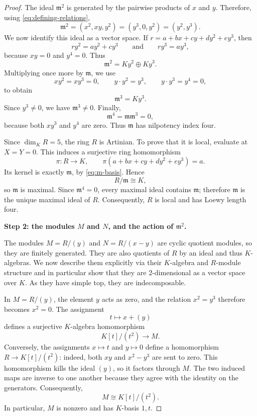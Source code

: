 \documentclass[a4paper]{amsart}
\theoremstyle{definition}
\theoremstyle{remark}
\numberwithin{equation}{section}
\begin{document}
\begin{proof}
The ideal $\mathfrak m^2$ is generated by the pairwise products of
$x$ and $y$.  Therefore, using \eqref{eq:defining-relations},
\[
 \mathfrak m^2=(x^2,xy,y^2)=(y^3,0,y^2)=(y^2,y^3).
\]
We now identify this ideal as a vector space.  If
$r=a+bx+cy+dy^2+ey^3$, then
\[
 ry^2=ay^2+cy^3
 \qquad\text{and}\qquad
 ry^3=ay^3,
\]
because $xy=0$ and $y^4=0$.  Thus
\begin{equation}\label{eq:m2-basis}
 \mathfrak m^2=Ky^2\oplus Ky^3.
\end{equation}
Multiplying once more by $\mathfrak m$, we use
\[
 xy^2=xy^3=0,
 \qquad
 y\cdot y^2=y^3,
 \qquad
 y\cdot y^3=y^4=0,
\]
to obtain
\begin{equation}\label{eq:m3-basis}
 \mathfrak m^3=Ky^3.
\end{equation}
Since $y^3\neq0$, we have $\mathfrak m^3\neq0$.  Finally,
\[
 \mathfrak m^4=\mathfrak m\mathfrak m^3=0,
\]
because both $xy^3$ and $y^4$ are zero.  Thus $\mathfrak m$ has nilpotency index four.

Since $\dim_K R=5$, the ring $R$ is Artinian.  To prove that it is local,
evaluate at $X=Y=0$.  This induces a surjective ring homomorphism
\[
 \pi:R\longrightarrow K,
 \qquad
 \pi(a+bx+cy+dy^2+ey^3)=a.
\]
Its kernel is exactly $\mathfrak m$, by \eqref{eq:m-basis}.  Hence
\[
 R/\mathfrak m\cong K,
\]
so $\mathfrak m$ is maximal.  Since $\mathfrak m^4=0$, every maximal ideal contains $\mathfrak m$; therefore $\mathfrak m$ is the unique maximal ideal of $R$.  Consequently, $R$ is local and has Loewy length four.

\medskip
\noindent
\textbf{Step 2: the modules $M$ and $N$, and the action of
$\mathfrak m^2$.}

The modules $M=R/(y)$ and $N=R/(x-y)$ are cyclic quotient modules, so
they are finitely generated. They are also quotients of $R$ by an ideal and thus $K$-algebras. We now describe them explicitly via their $K$-algebra and $R$-module structure and in particular show that they are 2-dimensional as a vector space over $K$. As they have simple top, they are  indecomposable.

In $M=R/(y)$, the element $y$ acts as zero, and the relation
$x^2=y^3$ therefore becomes $x^2=0$.  The assignment
\[
 t\longmapsto x+(y)
\]
defines a surjective $K$-algebra homomorphism
\[
 K[t]/(t^2)\longrightarrow M.
\]
Conversely, the assignments $x\mapsto t$ and $y\mapsto0$ define a
homomorphism $R\to K[t]/(t^2)$: indeed, both $xy$ and
$x^2-y^3$ are sent to zero.  This homomorphism kills the ideal $(y)$,
so it factors through $M$.  The two induced maps are inverse to one
another because they agree with the identity on the generators.
Consequently,
\begin{equation}\label{eq:M-dual-numbers}
 M\cong K[t]/(t^2).
\end{equation}
In particular, $M$ is nonzero and has $K$-basis $1,t$.


\end{proof}
\end{document}
